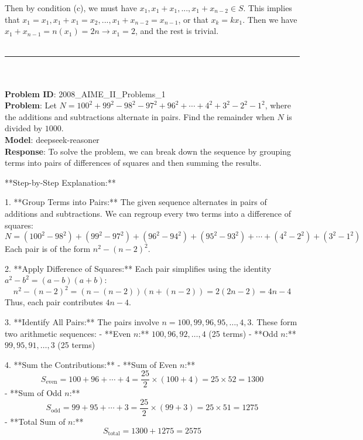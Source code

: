 {Then by condition (c), we must have $x_1,x_1+x_1,...,x_1+x_{n-2}\in S$. This implies that $x_1=x_1,x_1+x_1=x_2,...,x_1+x_{n-2}=x_{n-1}$, or that $x_k=kx_1$. Then we have $x_1+x_{n-1}=n(x_1)=2n \rightarrow x_1=2$, and the rest is trivial. \\
    \vspace{0.3cm} \\
    \hrule \\
    \vspace{0.5cm} \\
    \textbf{Problem ID}: 2008_AIME_II_Problems_1 \\
    \textbf{Problem}: Let $N = 100^2 + 99^2 - 98^2 - 97^2 + 96^2 + \cdots + 4^2 + 3^2 - 2^2 - 1^2$, where the additions and subtractions alternate in pairs. Find the remainder when $N$ is divided by $1000$. \\
    \textbf{Model}: deepseek-reasoner \\
    \textbf{Response}: To solve the problem, we can break down the sequence by grouping terms into pairs of differences of squares and then summing the results.

**Step-by-Step Explanation:**

1. **Group Terms into Pairs:**
   The given sequence alternates in pairs of additions and subtractions. We can regroup every two terms into a difference of squares:
   \[
   N = (100^2 - 98^2) + (99^2 - 97^2) + (96^2 - 94^2) + (95^2 - 93^2) + \cdots + (4^2 - 2^2) + (3^2 - 1^2)
   \]
   Each pair is of the form \( n^2 - (n-2)^2 \).

2. **Apply Difference of Squares:**
   Each pair simplifies using the identity \( a^2 - b^2 = (a-b)(a+b) \):
   \[
   n^2 - (n-2)^2 = (n - (n-2))(n + (n-2)) = 2(2n - 2) = 4n - 4
   \]
   Thus, each pair contributes \( 4n - 4 \).

3. **Identify All Pairs:**
   The pairs involve \( n = 100, 99, 96, 95, \ldots, 4, 3 \). These form two arithmetic sequences:
   - **Even \( n \):** \( 100, 96, 92, \ldots, 4 \) (25 terms)
   - **Odd \( n \):** \( 99, 95, 91, \ldots, 3 \) (25 terms)

4. **Sum the Contributions:**
   - **Sum of Even \( n \):**
     \[
     S_{\text{even}} = 100 + 96 + \cdots + 4 = \frac{25}{2} \times (100 + 4) = 25 \times 52 = 1300
     \]
   - **Sum of Odd \( n \):**
     \[
     S_{\text{odd}} = 99 + 95 + \cdots + 3 = \frac{25}{2} \times (99 + 3) = 25 \times 51 = 1275
     \]
   - **Total Sum of \( n \):**
     \[
     S_{\text{total}} = 1300 + 1275 = 2575
     \]

}
